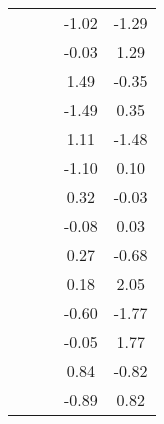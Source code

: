 \begin{table}
\begin{tabular}{c|cc|cc|}
\multicolumn{1}{|c|}{} & \multicolumn{1}{|c|}{} & \multicolumn{1}{|c|}{} & \multicolumn{1}{|c|}{     -1.02} & \multicolumn{1}{|c|}{     -1.29} \\ 
\multicolumn{1}{|c|}{} & \multicolumn{1}{|c|}{} & \multicolumn{1}{|c|}{} & \multicolumn{1}{|c|}{     -0.03} & \multicolumn{1}{|c|}{      1.29} \\ 
\multicolumn{1}{|c|}{} & \multicolumn{1}{|c|}{} & \multicolumn{1}{|c|}{} & \multicolumn{1}{|c|}{      1.49} & \multicolumn{1}{|c|}{     -0.35} \\ 
\multicolumn{1}{|c|}{} & \multicolumn{1}{|c|}{} & \multicolumn{1}{|c|}{} & \multicolumn{1}{|c|}{     -1.49} & \multicolumn{1}{|c|}{      0.35} \\ 
\multicolumn{1}{|c|}{} & \multicolumn{1}{|c|}{} & \multicolumn{1}{|c|}{} & \multicolumn{1}{|c|}{      1.11} & \multicolumn{1}{|c|}{     -1.48} \\ 
\multicolumn{1}{|c|}{} & \multicolumn{1}{|c|}{} & \multicolumn{1}{|c|}{} & \multicolumn{1}{|c|}{     -1.10} & \multicolumn{1}{|c|}{      0.10} \\ 
\multicolumn{1}{|c|}{} & \multicolumn{1}{|c|}{} & \multicolumn{1}{|c|}{} & \multicolumn{1}{|c|}{      0.32} & \multicolumn{1}{|c|}{     -0.03} \\ 
\multicolumn{1}{|c|}{} & \multicolumn{1}{|c|}{} & \multicolumn{1}{|c|}{} & \multicolumn{1}{|c|}{     -0.08} & \multicolumn{1}{|c|}{      0.03} \\ 
\multicolumn{1}{|c|}{} & \multicolumn{1}{|c|}{} & \multicolumn{1}{|c|}{} & \multicolumn{1}{|c|}{      0.27} & \multicolumn{1}{|c|}{     -0.68} \\ 
\multicolumn{1}{|c|}{} & \multicolumn{1}{|c|}{} & \multicolumn{1}{|c|}{} & \multicolumn{1}{|c|}{      0.18} & \multicolumn{1}{|c|}{      2.05} \\ 
\multicolumn{1}{|c|}{} & \multicolumn{1}{|c|}{} & \multicolumn{1}{|c|}{} & \multicolumn{1}{|c|}{     -0.60} & \multicolumn{1}{|c|}{     -1.77} \\ 
\multicolumn{1}{|c|}{} & \multicolumn{1}{|c|}{} & \multicolumn{1}{|c|}{} & \multicolumn{1}{|c|}{     -0.05} & \multicolumn{1}{|c|}{      1.77} \\ 
\multicolumn{1}{|c|}{} & \multicolumn{1}{|c|}{} & \multicolumn{1}{|c|}{} & \multicolumn{1}{|c|}{      0.84} & \multicolumn{1}{|c|}{     -0.82} \\ 
\multicolumn{1}{|c|}{} & \multicolumn{1}{|c|}{} & \multicolumn{1}{|c|}{} & \multicolumn{1}{|c|}{     -0.89} & \multicolumn{1}{|c|}{      0.82} \\ 

\end{tabular}
\end{table}
